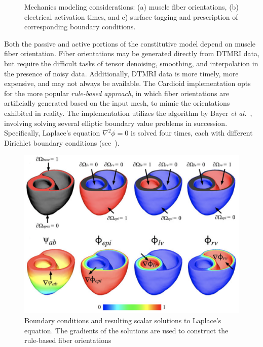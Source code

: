 \begin{figure}
{\label{fig:supp3}}
%
\caption{Mechanics modeling considerations: (a) muscle fiber orientations, (b) electrical activation times, and c) surface tagging and prescription of corresponding boundary conditions.}
\label{fig:supp}
\end{figure}

Both the passive and active portions of the constitutive model depend on muscle fiber orientation. Fiber orientations may be generated directly from DTMRI data, but require the difficult tasks of tensor denoising, smoothing, and interpolation in the presence of noisy data. Additionally, DTMRI data is more timely, more expensive, and may not always be available. The Cardioid implementation opts for the more popular \textit{rule-based approach}, in which fiber orientations are artificially generated based on the input mesh, to mimic the orientations exhibited in reality. The implementation utilizes the algorithm by Bayer \textit{et al.}~\cite{bayer_2012}, involving solving several elliptic boundary value problems in succession. Specifically, Laplace's equation $\nabla^2\phi = 0$ is solved four times, each with different Dirichlet boundary conditions (see~).

\begin{figure}[ht]
\centering
		\includegraphics[scale=0.3]{media/bayer.png}
\caption{Boundary conditions and resulting scalar solutions to Laplace's equation. The gradients of the solutions are used to construct the rule-based fiber orientations~\cite{bayer_2012}}
\label{fig:bayer}
\end{figure}

